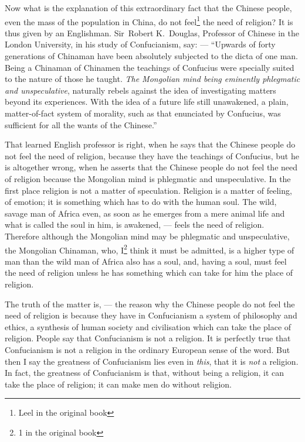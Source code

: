 Now what is the explanation of this extraordinary fact that the Chinese people, even the mass of the population in China, do not feel\footnote{Leel in the original book} the need of religion?
It is thus given by an Englishman.  
Sir~Robert K.~Douglas, Professor of Chinese in the London University, in his study of Confucianism, say:  --- ``Upwards of forty generations of Chinaman have been absolutely subjected to the dicta of one man. 
Being a Chinaman of Chinamen the teachings of Confucius were specially suited to the nature of those he taught. 
\emph{The Mongolian  mind being eminently phlegmatic and unspeculative}, naturally rebels against the idea of investigating matters beyond its experiences. 
With the idea of a future life still unawakened, a plain, matter-of-fact system of morality, such as that enunciated by Confucius, was sufficient for all the wants of the Chinese.''

That learned English professor is right, when he says that the Chinese people do not feel the need of religion, because they have the teachings of Confucius, but he is altogether wrong, when he asserts that the Chinese people do not feel the need of religion because the Mongolian mind is phlegmatic and unspeculative. 
In the first place religion is not a matter of speculation.
Religion is a matter of feeling, of emotion; it is something which has to do with the human soul.
The wild, savage man of Africa even, as soon as he emerges from a mere animal life and what is called the soul in him, is awakened, --- feels the need of religion.
Therefore although the Mongolian mind may be phlegmatic and unspeculative, the Mongolian Chinaman, who, I\footnote{1 in the original book} think it must be admitted, is a higher type of man than the wild man of Africa also has a soul, and, having a soul, must feel the need of religion unless he has something which can take for him the place of religion.

The truth of the matter is, --- the reason why the Chinese people do not feel the need of religion is because they have in Confucianism a system of philosophy and ethics, a synthesis of human society and civilisation which can take the place of religion.
People say that Confucianism is not a religion.
It is perfectly true that Confucianism is not a religion in the ordinary European sense of the word.
But then I say the greatness of Confucianism lies even in \emph{this}, that it is \emph{not} a religion.
In fact, the greatness of Confucianism is that, without being a religion, it can take the place of religion; it can make men do without religion.

